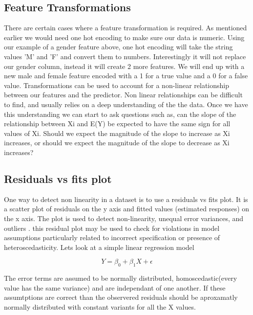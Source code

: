 \subsection*{Feature Transformations}

There are certain cases where a feature transformation is required. As mentioned earlier we would need one hot encoding to make sure our data is numeric. Using our example of a gender feature above, one hot encoding will take the string values 'M' and 'F' and convert them to numbers. Interestingly it will not replace our gender column, instead it will create 2 more features. We will end up with a new male and female feature encoded with a 1 for a true value and a 0 for a false value.
Transformations can be used to account for a non-linear relationship between our features and the predictor. Non linear relationships can be difficult to find, and usually relies on a deep understanding of the the data. Once we have this understanding we can start to ask questions such as, can the slope of
the relationship between Xi and E(Y) be expected to have the same sign for all values of Xi. Should we expect the magnitude of the slope to increase as Xi increases, or should we expect
the magnitude of the slope to decrease as Xi increases?\cite{nonlinearRelationships}

\subsection*{Residuals vs fits plot}

One way to detect non linearity in a dataset is to use a residuals vs fits plot. It is a scatter plot of residuals on the y axis and fitted values (estimated responses) on the x axis. The plot is used to detect non-linearity, unequal error variances, and outliers \cite{residualsVsFitsPlot}. this residual plot may be used to check for violations in model assumptions particularly related to incorrect specification or presence of heteroscedasticity\cite{doi:10.1002/9781118625590.ch2}. Lets look at a simple linear regression model

\[ Y = \beta_0 + \beta_1X + \epsilon \]

The error terms are assumed to be normally distributed, homoscedastic(every value has the same variance) and are  independant of one another. If these assumtptions are correct than the observered residuals should be aproxamatly normally distributed with constant variants for all the X values.


